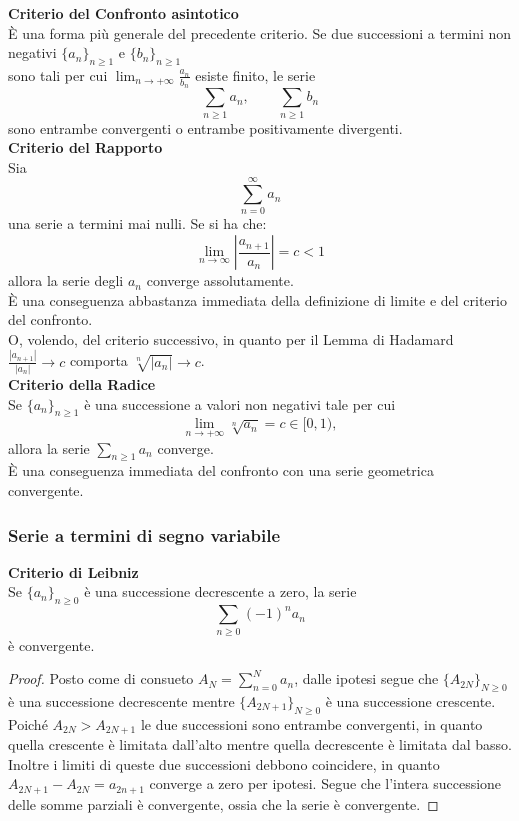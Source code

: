 \documentclass[a4paper,twoside]{article}
\theoremstyle{definition}
\numberwithin{theorem}{section}
\begin{document}
\textbf{Criterio del Confronto asintotico} \\
È una forma più generale del precedente criterio. Se due successioni a termini non negativi $\{a_n\}_{n\geq 1}$ e $\{b_n\}_{n\geq 1}$ \\sono tali per cui $\lim_{n\to+\infty}\frac{a_n}{b_n}$ esiste finito, le serie 
$$ \sum_{n\geq 1} a_n,\qquad \sum_{n\geq 1} b_n $$
sono entrambe convergenti o entrambe positivamente divergenti.\\

\textbf{Criterio del Rapporto} \\
Sia
$$\sum_{n=0}^{\infty}a_n$$
una serie a termini mai nulli. Se si ha che:
$$\lim_{n\to\infty} \left|\frac{a_{n+1}}{a_n}\right|=c<1$$
allora la serie degli $a_n$ converge assolutamente.\\
È una conseguenza abbastanza immediata della definizione di limite e del criterio del confronto.\\ O, volendo, del criterio successivo, in quanto per il Lemma di Hadamard $\frac{|a_{n+1}|}{|a_n|}\to c$ comporta $\sqrt[n]{|a_n|}\to c$.\\

\textbf{Criterio della Radice} \\
Se $\{a_n\}_{n\geq 1}$ è una successione a valori non negativi tale per cui
$$ \lim_{n\to +\infty}\sqrt[n]{a_n} = c \in [0,1), $$
allora la serie $\sum_{n\geq 1}a_n$ converge.\\
È una conseguenza immediata del confronto con una serie geometrica convergente.

\subsubsection{Serie a termini di segno variabile}

\textbf{Criterio di Leibniz}\\
Se $\{a_n\}_{n\geq 0}$ è una successione decrescente a zero, la serie
$$ \sum_{n\geq 0} (-1)^n a_n $$
è convergente.\\
\begin{proof} Posto come di consueto $A_N=\sum_{n=0}^{N}a_n$, dalle ipotesi segue che $\{A_{2N}\}_{N\geq 0}$ è una successione decrescente mentre $\{A_{2N+1}\}_{N\geq 0}$ è una successione crescente. Poiché $A_{2N} > A_{2N+1}$ le due successioni sono entrambe convergenti, in quanto quella crescente è limitata dall'alto mentre quella decrescente è limitata dal basso. Inoltre i limiti di queste due successioni debbono coincidere, in quanto $A_{2N+1}-A_{2N}=a_{2n+1}$ converge a zero per ipotesi. Segue che l'intera successione delle somme parziali è convergente, ossia che la serie è convergente. 
\end{proof}
\end{document}
